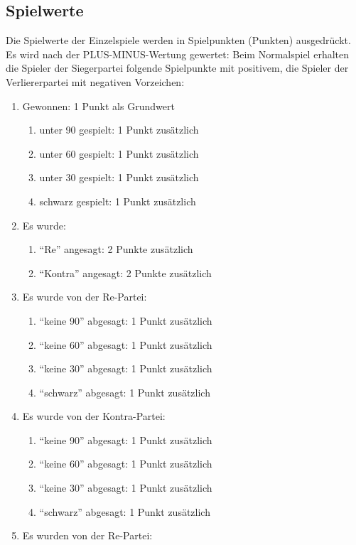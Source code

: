 \documentclass[12pt]{scrartcl}
\begin{document}
\subsection{Spielwerte}
Die Spielwerte der Einzelspiele werden in Spielpunkten (Punkten)
ausgedrückt. Es wird nach der PLUS-MINUS-Wertung gewertet: Beim
Normalspiel erhalten die Spieler der Siegerpartei folgende
Spielpunkte mit positivem, die Spieler der Verliererpartei mit
negativen Vorzeichen:
\begin{enumerate}
  \item Gewonnen: 1 Punkt als Grundwert
    \begin{enumerate}
      \item unter 90 gespielt: 1 Punkt zusätzlich
      \item unter 60 gespielt: 1 Punkt zusätzlich
      \item unter 30 gespielt: 1 Punkt zusätzlich
      \item schwarz gespielt: 1 Punkt zusätzlich
    \end{enumerate}
  \item Es wurde:
    \begin{enumerate}
      \item "`Re"' angesagt: 2 Punkte zusätzlich
      \item "`Kontra"' angesagt: 2 Punkte zusätzlich
    \end{enumerate}
  \item Es wurde von der Re-Partei:
    \begin{enumerate}
      \item "`keine 90"' abgesagt: 1 Punkt zusätzlich
      \item "`keine 60"' abgesagt: 1 Punkt zusätzlich
      \item "`keine 30"' abgesagt: 1 Punkt zusätzlich
      \item "`schwarz"' abgesagt: 1 Punkt zusätzlich
    \end{enumerate}
  \item Es wurde von der Kontra-Partei:
    \begin{enumerate}
      \item "`keine 90"' abgesagt: 1 Punkt zusätzlich
      \item "`keine 60"' abgesagt: 1 Punkt zusätzlich
      \item "`keine 30"' abgesagt: 1 Punkt zusätzlich
      \item "`schwarz"' abgesagt: 1 Punkt zusätzlich
    \end{enumerate}
  \item Es wurden von der Re-Partei:

\end{enumerate}
\end{document}
